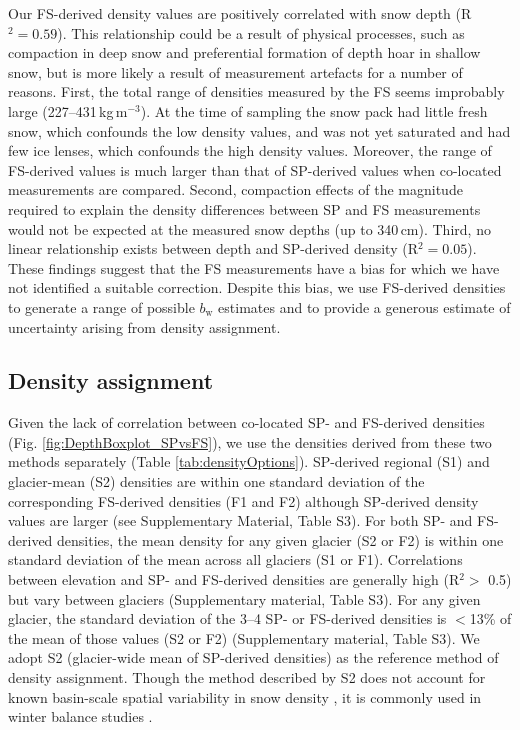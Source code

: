 \documentclass[twocolumn, letterpaper]{igs}
\begin{document}
Our FS-derived density values are positively correlated with snow depth (R$^2= 0.59$). This relationship could be a result of physical processes, such as compaction in deep snow and preferential formation of depth hoar in shallow snow, but is more likely a result of measurement artefacts for a number of reasons. First, the total range of densities measured by the FS seems improbably large (227--431\,kg\,m$^{-3}$). At the time of sampling the snow pack had little fresh snow, which confounds the low density values, and was not yet saturated and had few ice lenses, which confounds the high density values. Moreover, the range of FS-derived values is much larger than that of SP-derived values when co-located measurements are compared. Second, compaction effects of the magnitude required to explain the density differences between SP and FS measurements would not be expected at the measured snow depths (up to 340\,cm). Third, no linear relationship exists between depth and SP-derived density (R$^2 = 0.05$). These findings suggest that the FS measurements have a bias for which we have not identified a suitable correction. Despite this bias, we use FS-derived densities to generate a range of possible $b_\mathrm{w}$ estimates and to provide a generous estimate of uncertainty arising from density assignment.

\subsection{Density assignment}

Given the lack of correlation between co-located SP- and FS-derived densities (Fig. \ref{fig:DepthBoxplot_SPvsFS}), we use the densities derived from these two methods separately (Table \ref{tab:densityOptions}). SP-derived regional (S1) and glacier-mean (S2) densities are within one standard deviation of the corresponding FS-derived densities (F1 and F2) although SP-derived density values are larger (see Supplementary Material, Table S3). For both SP- and FS-derived densities, the mean density for any given glacier (S2 or F2) is within one standard deviation of the mean across all glaciers (S1 or F1). Correlations between elevation and SP- and FS-derived densities are generally high (R$^2>$ 0.5) but vary between glaciers (Supplementary material, Table S3). For any given glacier, the standard deviation of the 3--4 SP- or FS-derived densities is $<$13\% of the mean of those values (S2 or F2) (Supplementary material, Table S3). We adopt S2 (glacier-wide mean of SP-derived densities) as the reference method of density assignment. Though the method described by S2 does not account for known basin-scale spatial variability in snow density \citep[e.g.][]{Wetlaufer2016}, it is commonly used in winter balance studies \citep[e.g.][]{Elder1991,McGrath2015,Cullen2017}. 
\end{document}
